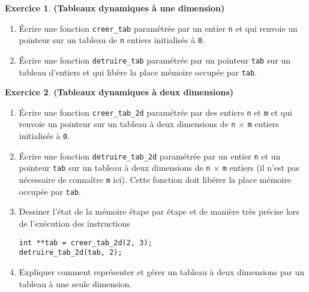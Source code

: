 \documentclass[12pt]{article}
\theoremstyle{definition}
\newtheorem{Exercice}{Exercice}
\begin{document}
\begin{Exercice} {\bf (Tableaux dynamiques à une dimension)}\smallskip

\begin{enumerate}
    \item Écrire une fonction {\tt creer\_tab} paramétrée par un entier
    {\tt n} et qui renvoie un pointeur sur un tableau de {\tt n} entiers
    initialisés à {\tt 0}.
    \smallskip

    \item Écrire une fonction {\tt detruire\_tab} paramétrée par un
    pointeur {\tt tab} sur un tableau d'entiers et qui libère la place
    mémoire occupée par {\tt tab}.
\end{enumerate}
\end{Exercice}
\bigskip

\begin{Exercice} {\bf (Tableaux dynamiques à deux dimensions)}\smallskip

\begin{enumerate}
    \item Écrire une fonction {\tt creer\_tab\_2d} paramétrée par des
    entiers {\tt n} et {\tt m} et qui renvoie un pointeur sur un tableau
    à deux dimensions de {\tt n} $\times$ {\tt m} entiers initialisés
    à {\tt 0}.
    \smallskip

    \item Écrire une fonction {\tt detruire\_tab\_2d} paramétrée par un
    entier {\tt n} et un pointeur {\tt tab} sur un tableau à deux
    dimensions de {\tt n} $\times$ {\tt m} entiers (il n'est pas
    nécessaire de connaître {\tt m} ici). Cette fonction doit libérer la
    place mémoire occupée par {\tt tab}.
    \smallskip

    \item Dessiner l'état de la mémoire étape par étape et de manière
    très précise lors de l'exécution des instructions
\begin{lstlisting}
int **tab = creer_tab_2d(2, 3);
detruire_tab_2d(tab, 2);
\end{lstlisting}
    \smallskip

    \item Expliquer comment représenter et gérer un tableau à deux
    dimensions par un tableau à une seule dimension.
\end{enumerate}
\end{Exercice}
\bigskip
\end{document}
